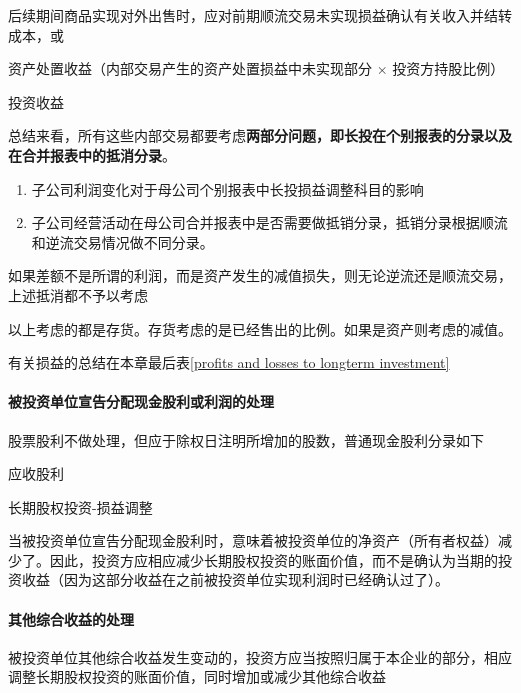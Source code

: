 \documentclass[UTF8,12pt]{ctexart}
\newenvironment{Dr}{%
	\begin{list}{}%
		{
			\setlength{\leftmargin}{2em}
			\setlength{\labelwidth}{2em}
			\setlength{\labelsep}{0pt}
			\setlength{\itemindent}{0pt}
			\setlength{\listparindent}{0pt}
			\setlength{\parsep}{0pt}
			\setlength{\topsep}{0pt}
		}
		\item[\textbf{借：}]
	}{%
	\end{list}
}
\newenvironment{Cr}{%
	\begin{list}{}%
		{
			\setlength{\leftmargin}{3em}
			\setlength{\labelwidth}{2em}
			\setlength{\labelsep}{0pt}
			\setlength{\itemindent}{0pt}
			\setlength{\listparindent}{0pt}
			\setlength{\parsep}{0pt}
			\setlength{\topsep}{0pt}
		}
		\item[\textbf{贷：}]
	}{%
	\end{list}
}
\numberwithin{equation}{section} %
\numberwithin{figure}{section}
\numberwithin{table}{section}
\begin{document}
	后续期间商品实现对外出售时，应对前期顺流交易未实现损益确认有关收入并结转成本，或
	
	\begin{Dr}
		资产处置收益（内部交易产生的资产处置损益中未实现部分 $\times$ 投资方持股比例）
	\end{Dr}
	\begin{Cr}
		投资收益 
	\end{Cr}
	
	
	总结来看，所有这些内部交易都要考虑\textbf{两部分问题，即长投在个别报表的分录以及在合并报表中的抵消分录}。
	\begin{enumerate}
		\item 子公司利润变化对于母公司个别报表中长投损益调整科目的影响
		
		\item 子公司经营活动在母公司合并报表中是否需要做抵销分录，抵销分录根据顺流和逆流交易情况做不同分录。
	\end{enumerate}
	
	如果差额不是所谓的利润，而是资产发生的减值损失，则无论逆流还是顺流交易，上述抵消都不予以考虑
	
	以上考虑的都是存货。存货考虑的是已经售出的比例。如果是资产则考虑的减值。
	
	有关损益的总结在本章最后表\ref{profits and losses to longterm investment}
	
	\paragraph{被投资单位宣告分配现金股利或利润的处理}股票股利不做处理，但应于除权日注明所增加的股数，普通现金股利分录如下
	
	\begin{Dr}
		应收股利
	\end{Dr}
	\begin{Cr}
		长期股权投资-损益调整
	\end{Cr}
	
	当被投资单位宣告分配现金股利时，意味着被投资单位的净资产（所有者权益）减少了。因此，投资方应相应减少长期股权投资的账面价值，而不是确认为当期的投资收益（因为这部分收益在之前被投资单位实现利润时已经确认过了）。
	
	
	\paragraph{其他综合收益的处理}
	被投资单位其他综合收益发生变动的，投资方应当按照归属于本企业的部分，相应调整长期股权投资的账面价值，同时增加或减少其他综合收益
	
\end{document}
